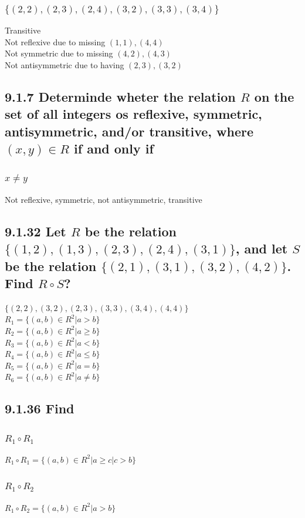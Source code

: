 \documentclass[12pt, a4paper]{report}
\begin{document}
					\subsubsection{$\{(2,2),(2,3),(2,4),(3,2),(3,3),(3,4)\}$}
						Transitive\\
						Not reflexive due to missing $(1,1),(4,4)$\\
						Not symmetric due to missing $(4,2),(4,3)$\\
						Not antisymmetric due to having $(2,3),(3,2)$
				\setcounter{subsection}{6}
				\subsection{9.1.7 Determinde wheter the relation $R$ on the set of all integers os reflexive, symmetric, antisymmetric, and/or transitive, where $(x,y)\in R$ if and only if}
					\subsubsection{$x\neq y$}
						Not reflexive, symmetric, not antisymmetric, transitive
				\setcounter{subsection}{31}
				\subsection{9.1.32 Let $R$ be the relation $\{(1,2),(1,3),(2,3),(2,4),(3,1)\}$, and let $S$ be the relation $\{(2,1),(3,1),(3,2),(4,2)\}$. Find $R \circ S$?}
					$\{(2,2),(3,2),(2,3),(3,3),(3,4),(4,4)\}$\\[5mm]
				$R_1=\{(a,b)\in R^2|a>b\}$\\
				$R_2=\{(a,b)\in R^2|a\geq b\}$\\
				$R_3=\{(a,b)\in R^2|a<b\}$\\
				$R_4=\{(a,b)\in R^2 | a\leq b\}$\\
				$R_5=\{(a,b)\in R^2|a=b\}$\\
				$R_6=\{(a,b)\in R^2|a\neq b\}$
				\setcounter{subsection}{35}
				\subsection{9.1.36 Find}
					\subsubsection{$R_1\circ R_1$}
						$R_1\circ R_1 = \{(a,b)\in R^2|a\geq c | c>b\}$
					\subsubsection{$R_1\circ R_2$}
						$R_1\circ R_2 = \{(a,b)\in R^2|a>b\}$
\end{document}

